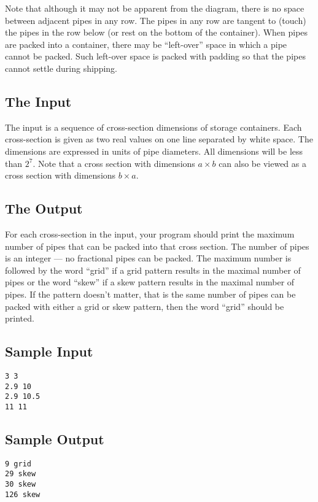 Note that although it may not be apparent from the diagram, there is no
space between adjacent pipes in any row.  The pipes in any row are
tangent to (touch) the pipes in the row below (or rest on the bottom of the
container).  When pipes are packed into a container, there may be
``left-over'' space in which a pipe cannot be packed.  Such left-over
space is packed with padding so that the pipes cannot settle during
shipping.

\subsection*{The Input}
The input is a sequence of cross-section dimensions of storage
containers.  Each cross-section is given as two real values on one line
separated by white space.  The dimensions are expressed in units of pipe
diameters.  All dimensions will be less than $2^7$.  
Note that a cross section with dimensions $a \times
b$ can also be viewed as a cross section with dimensions $b \times a$.

\subsection*{The Output}
For each cross-section in the input, your program should print the
maximum number of pipes that can be packed into that cross section.
The number of pipes is an integer --- no fractional
pipes can be packed.  The maximum number is followed by the word
``grid'' if a grid pattern results in the maximal number of pipes or
the word ``skew'' if a skew pattern results in the maximal number of
pipes.  If the pattern doesn't matter, that is the same number of pipes
can be packed with either a grid or skew pattern, then the word ``grid''
should be printed.  


\clearpage

\subsection*{Sample Input}
\begin{verbatim}
3 3
2.9 10
2.9 10.5
11 11
\end{verbatim}


\subsection*{Sample Output}
\begin{verbatim}
9 grid
29 skew
30 skew
126 skew
\end{verbatim}

